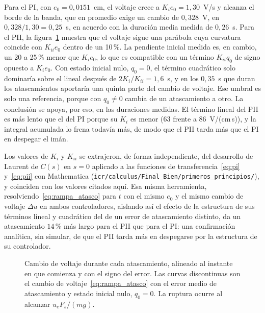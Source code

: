 Para el PI, con $e_0=0{,}0151$~cm, el voltaje crece a $K_i e_0 = 1{,}30$~V/s y alcanza el borde de la banda, que en promedio exige un cambio de $0{,}328$~V, en $0{,}328/1{,}30=0{,}25$~s, en acuerdo con la duración media medida de $0{,}26$~s. Para el PII, la figura~\ref{fig:atasco} muestra que el voltaje sigue una parábola cuya curvatura coincide con $K_{ii}e_0$ dentro de un 10\,\%. La pendiente inicial medida es, en cambio, un 20 a 25\,\% menor que $K_i e_0$, lo que es compatible con un término $K_{ii}q_0$ de signo opuesto a $K_i e_0$. Con estado inicial nulo, $q_0=0$, el término cuadrático solo dominaría sobre el lineal después de $2K_i/K_{ii}=1{,}6$~s, y en los $0{,}35$~s que duran los atascamientos aportaría una quinta parte del cambio de voltaje. Ese umbral es solo una referencia, porque con $q_0\neq0$ cambia de un atascamiento a otro. La conclusión se apoya, por eso, en las duraciones medidas. El término lineal del PII es más lento que el del PI porque su $K_i$ es menor (63 frente a 86~V/(cm\,s)), y la integral acumulada lo frena todavía más, de modo que el PII tarda más que el PI en despegar el imán.

Los valores de $K_i$ y $K_{ii}$ se extrajeron, de forma independiente, del desarrollo de Laurent de $C(s)$ en $s=0$ aplicado a las funciones de transferencia~\eqref{eq:pi} y~\eqref{eq:pii} con Mathematica (\texttt{icr/calculus/Final\_Bien/primeros\_principios/}), y coinciden con los valores citados aquí. Esa misma herramienta, resolviendo~\eqref{eq:rampa_atasco} para $t$ con el mismo $e_0$ y el mismo cambio de voltaje $\Delta u$ en ambos controladores, aislando así el efecto de la estructura de sus términos lineal y cuadrático del de un error de atascamiento distinto, da un atascamiento $14$\,\% más largo para el PII que para el PI: una confirmación analítica, sin simular, de que el PII tarda más en despegarse por la estructura de su controlador.

\begin{figure}[ht]
    \centering
    
    \caption[Voltaje durante el atascamiento]{Cambio de voltaje durante cada atascamiento, alineado al instante en que comienza y con el signo del error. Las curvas discontinuas son el cambio de voltaje~\eqref{eq:rampa_atasco} con el error medio de atascamiento y estado inicial nulo, $q_0=0$. La ruptura ocurre al alcanzar $u_eF_s/(mg)$.}
    \label{fig:atasco}
\end{figure}

